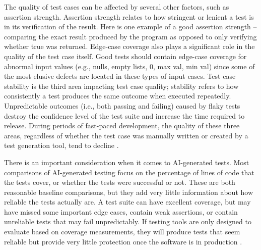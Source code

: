 \documentclass[conference]{IEEEtran}
\begin{document}
The quality of test cases can be affected by several other factors, such as assertion strength. Assertion strength relates to how stringent or lenient a test is in its verification of the result. Here is one example of a good assertion strength -- comparing the exact result produced by the program as opposed to only verifying whether true was returned. Edge-case coverage also plays a significant role in the quality of the test case itself. Good tests should contain edge-case coverage for abnormal input values (e.g., nulls, empty lists, 0, max val, min val) since some of the most elusive defects are located in these types of input cases. Test case stability is the third area impacting test case quality; stability refers to how consistently a test produces the same outcome when executed repeatedly. Unpredictable outcomes (i.e., both passing and failing) caused by flaky tests destroy the confidence level of the test suite and increase the time required to release. During periods of fast-paced development, the quality of these three areas, regardless of whether the test case was manually written or created by a test generation tool, tend to decline \cite{barraood2021test,crispin2006driving}.


There is an important consideration when it comes to AI-generated tests. Most comparisons of AI-generated testing focus on the percentage of lines of code that the tests cover, or whether the tests were successful or not. These are both reasonable baseline comparisons, but they add very little information about how reliable the tests actually are. A test suite can have excellent coverage, but may have missed some important edge cases, contain weak assertions, or contain unreliable tests that may fail unpredictably. If testing tools are only designed to evaluate based on coverage measurements, they will produce tests that seem reliable but provide very little protection once the software is in production \cite{yang2006survey}.
\end{document}
